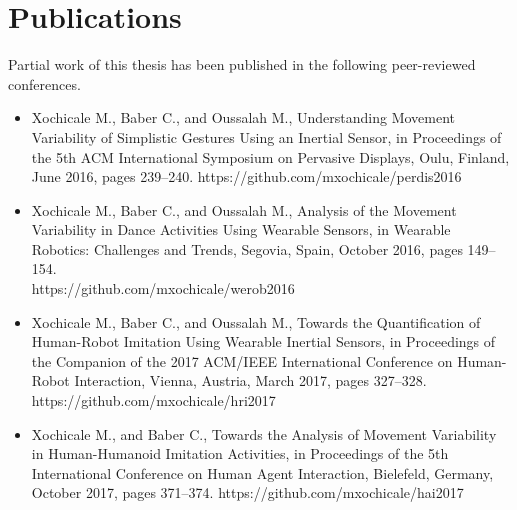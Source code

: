 \section{Publications}
Partial work of this thesis has been published in the following peer-reviewed 
conferences.
\begin{itemize}
\item Xochicale M., Baber C., and Oussalah M.,
	Understanding Movement Variability of Simplistic Gestures Using 
	an Inertial Sensor, in Proceedings of the 5th ACM International 
	Symposium on Pervasive Displays, 
	Oulu, Finland, June 2016, 
	pages 239--240.
	https://github.com/mxochicale/perdis2016

\item Xochicale M., Baber C., and Oussalah M.,
	Analysis of the Movement Variability in Dance Activities Using 
	Wearable Sensors,
	in Wearable Robotics: Challenges and Trends,
	Segovia, Spain, October 2016,
	pages 149--154. \\
	https://github.com/mxochicale/werob2016

\item Xochicale M., Baber C., and Oussalah M.,
	Towards the Quantification of Human-Robot Imitation Using Wearable 
	Inertial Sensors, in Proceedings of the Companion of the 2017 
	ACM/IEEE International Conference on Human-Robot Interaction,
	Vienna, Austria, March 2017,
	pages 327--328. \\
	https://github.com/mxochicale/hri2017

\item Xochicale M., and Baber C.,
	Towards the Analysis of Movement Variability in Human-Humanoid 
	Imitation Activities, in Proceedings of the 5th International 
	Conference on Human Agent Interaction,
	Bielefeld, Germany, October 2017,
	pages 371--374.
	https://github.com/mxochicale/hai2017

\end{itemize}



